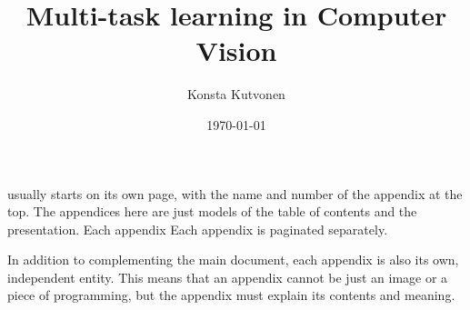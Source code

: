 \documentclass[english,twoside,censored,csm,algorithms-track-2020]{HYthesisML}
\title{Multi-task learning in Computer Vision}
\author{Konsta Kutvonen}
\date{\today}
\begin{document}
\maketitle



\newpage
\mytableofcontents
\frontmatter


%
%
%





% 

\cleardoublepage                          %
{}  %
\printbibliography

\backmatter
\begin{appendices}

%

usually starts on its own page, with the name and number of the appendix at the top. 
The appendices here are just models of the table of contents and the presentation. Each appendix
Each appendix is paginated separately.

In addition to complementing the main document, each appendix is also its own, independent entity.
This means that an appendix cannot be just an image or a piece of programming, but the appendix must explain its contents and meaning.

\end{appendices}
\end{document}
